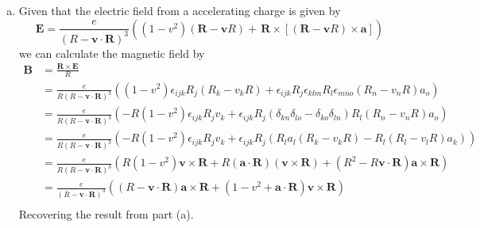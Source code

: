 \documentclass[11pt]{article}
\numberwithin{equation}{section}
\begin{document}
\begin{enumerate}[(a)]
\item
    Given that the electric field from a accelerating charge is given by
    \begin{equation}
        \mathbf{E} = \frac{e}{(R-\mathbf{v}\cdot\mathbf{R})^3}\left((1-v^2)(\mathbf{R}-\mathbf{v}R) + \frac{}{}\mathbf{R}\times\left[(\mathbf{R}-\mathbf{v}R)\times\mathbf{a}\right]\right)
    \end{equation}
    we can calculate the magnetic field by
    \begin{align*}
        \mathbf{B} &= \frac{\mathbf{R}\times\mathbf{E}}{R}\\
                   &= \frac{e}{R(R-\mathbf{v}\cdot\mathbf{R})^3}\left((1-v^2)\epsilon_{ijk}R_j(R_k-v_kR) + \epsilon_{ijk}R_j\epsilon_{klm}R_l\epsilon_{mno}(R_n-v_nR)a_o\right)\\
                   &= \frac{e}{R(R-\mathbf{v}\cdot\mathbf{R})^3}\left(-R(1-v^2)\epsilon_{ijk}R_jv_k + \epsilon_{ijk}R_j(\delta_{kn}\delta_{lo}-\delta_{ko}\delta_{ln})R_l(R_n-v_nR)a_o\right)\\
                   &= \frac{e}{R(R-\mathbf{v}\cdot\mathbf{R})^3}\left(-R(1-v^2)\epsilon_{ijk}R_jv_k + \epsilon_{ijk}R_j(R_la_l(R_k-v_kR) - R_l(R_l-v_lR)a_k)\right)\\
                   &= \frac{e}{R(R-\mathbf{v}\cdot\mathbf{R})^3}\left(R(1-v^2)\mathbf{v}\times\mathbf{R} + R(\mathbf{a}\cdot\mathbf{R})(\mathbf{v}\times\mathbf{R}) + (R^2-R\mathbf{v}\cdot\mathbf{R})\mathbf{a}\times\mathbf{R}\right)\\
                   &= \frac{e}{(R-\mathbf{v}\cdot\mathbf{R})^3}\left((R-\mathbf{v}\cdot\mathbf{R})\mathbf{a}\times\mathbf{R} + (1-v^2+\mathbf{a}\cdot\mathbf{R})\mathbf{v}\times\mathbf{R} \right)\\
    \end{align*}
    Recovering the result from part (a).
\end{enumerate}
\end{document}
